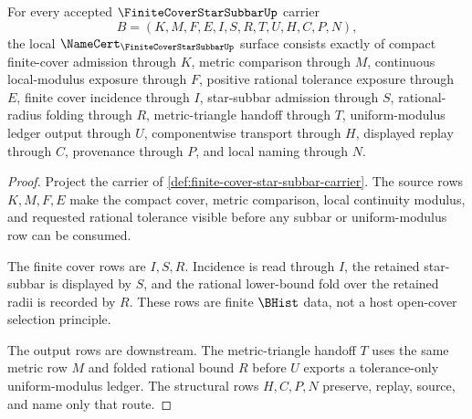 \begin{theorem}\label{thm:finite-cover-star-subbar-namecert-obligations}
For every accepted $\FiniteCoverStarSubbarUp$ carrier
$$
B=(K,M,F,E,I,S,R,T,U,H,C,P,N),
$$
the local $\NameCert_{\FiniteCoverStarSubbarUp}$ surface consists exactly of compact finite-cover admission through $K$, metric comparison through $M$, continuous local-modulus exposure through $F$, positive rational tolerance exposure through $E$, finite cover incidence through $I$, star-subbar admission through $S$, rational-radius folding through $R$, metric-triangle handoff through $T$, uniform-modulus ledger output through $U$, componentwise transport through $H$, displayed replay through $C$, provenance through $P$, and local naming through $N$.
\end{theorem}
\begin{proof}
Project the carrier of \autoref{def:finite-cover-star-subbar-carrier}. The source rows $K,M,F,E$ make the compact cover, metric comparison, local continuity modulus, and requested rational tolerance visible before any subbar or uniform-modulus row can be consumed.

The finite cover rows are $I,S,R$. Incidence is read through $I$, the retained star-subbar is displayed by $S$, and the rational lower-bound fold over the retained radii is recorded by $R$. These rows are finite $\BHist$ data, not a host open-cover selection principle.

The output rows are downstream. The metric-triangle handoff $T$ uses the same metric row $M$ and folded rational bound $R$ before $U$ exports a tolerance-only uniform-modulus ledger. The structural rows $H,C,P,N$ preserve, replay, source, and name only that route.
\end{proof}

